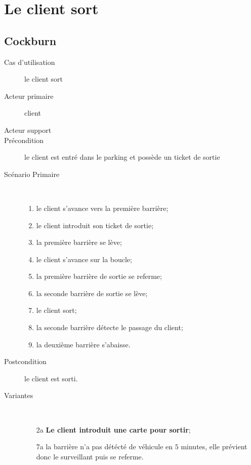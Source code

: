 \documentclass[a4paper]{article}
\begin{document}
\newpage

\section{Le client sort}
\subsection{Cockburn}
\begin{description}
	\item[Cas d'utilisation] le client sort
	\item[Acteur primaire] client
	\item[Acteur support]
	\item[Pr\'econdition] le client est entr\'e dans le parking et poss\`ede un ticket de sortie
	\item[Sc\'enario Primaire] \
	\begin{enumerate}
		\item le client s'avance vers la premi\`ere barri\`ere;
		\item le client introduit son ticket de sortie;
		\item la premi\`ere barri\`ere se l\`eve;
		\item le client s'avance sur la boucle;
		\item la premi\`ere barri\`ere de sortie se referme;
		\item la seconde barri\`ere de sortie se l\`eve;
		\item le client sort;
		\item la seconde barri\`ere d\'etecte le passage du client;
		\item la deuxi\`eme barri\`ere s'abaisse.
	\end{enumerate}
	\item[Postcondition] le client est sorti.
	\item[Variantes] \
	\begin{enumerate}
		\item[2a] \textbf{Le client introduit une carte pour sortir};
		\item[7a] la barri\`ere n'a pas d\'et\'ect\'e de v\'ehicule en $5$ minutes,
			elle pr\'evient donc le surveillant puis se referme.
	\end{enumerate}
\end{description}
\end{document}
